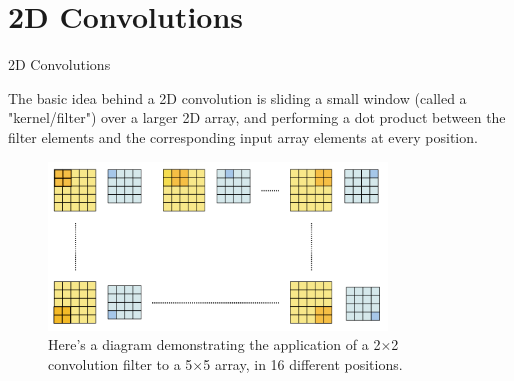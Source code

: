 \section{2D Convolutions}

\begin{vbframe}{2D Convolutions}

The basic idea behind a 2D convolution is sliding a small window (called a "kernel/filter") over a larger 2D array, and performing a dot product between the filter elements and the corresponding input array elements at every position.
    \begin{figure}
        \centering
        \includegraphics[width=9cm]{figure/padding3.png}
        \caption{\tiny Here's a diagram demonstrating the application of a 2$\times$2 convolution filter to a 5$\times$5 array, in 16 different positions.}
    \end{figure}
\end{vbframe}

